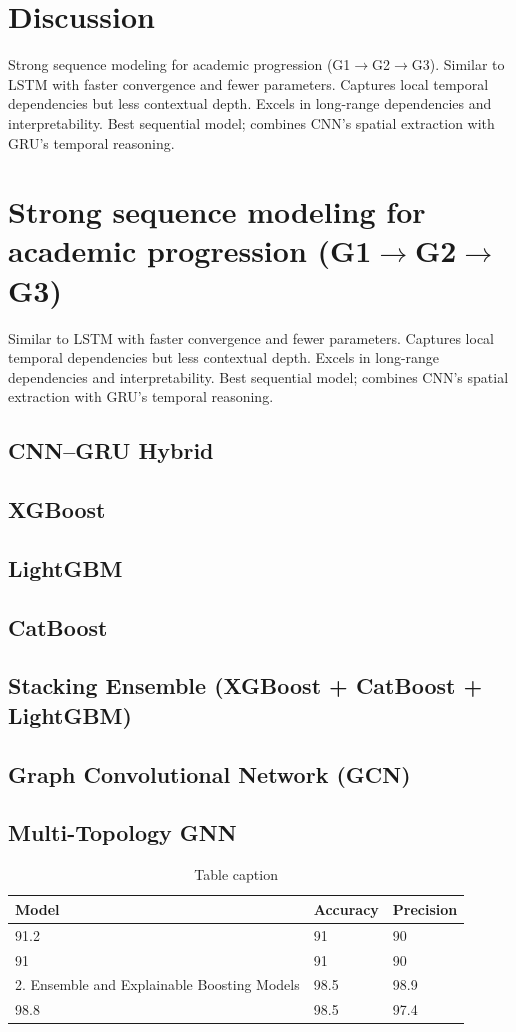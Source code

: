 \documentclass[twocolumn]{svjour3}
\begin{document}
\section{Discussion}
Strong sequence modeling for academic progression (G1$\rightarrow$G2$\rightarrow$G3).
Similar to LSTM with faster convergence and fewer parameters.
Captures local temporal dependencies but less contextual depth.
Excels in long-range dependencies and interpretability.
Best sequential model; combines CNN’s spatial extraction with GRU’s temporal reasoning.

\section{Strong sequence modeling for academic progression (G1$\rightarrow$G2$\rightarrow$G3)}
Similar to LSTM with faster convergence and fewer parameters.
Captures local temporal dependencies but less contextual depth.
Excels in long-range dependencies and interpretability.
Best sequential model; combines CNN’s spatial extraction with GRU’s temporal reasoning.
\subsection{CNN–GRU Hybrid}
\subsection{XGBoost}
\subsection{LightGBM}
\subsection{CatBoost}
\subsection{Stacking Ensemble (XGBoost + CatBoost + LightGBM)}
\subsection{Graph Convolutional Network (GCN)}
\subsection{Multi-Topology GNN}
\begin{table}
\centering
\caption{Table caption}
\begin{tabular}{lll}
\hline
Model & Accuracy & Precision \\
\hline
91.2 & 91 & 90 \\
91 & 91 & 90 \\
2. Ensemble and Explainable Boosting Models & 98.5 & 98.9 \\
98.8 & 98.5 & 97.4 \\
\hline
\end{tabular}
\end{table}
\end{document}
